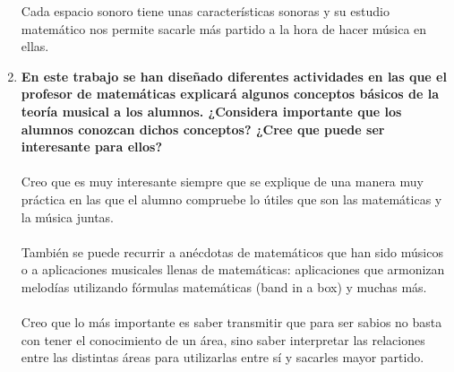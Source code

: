 \documentclass[a4paper, openright, 11pt, titlepage]{report}
\theoremstyle{definition}\newtheorem{defin}[propo]{Definition}
\theoremstyle{definition}\newtheorem{obser}[propo]{Remark}
\theoremstyle{definition}\newtheorem{ejem}[propo]{Ejemplo}
\theoremstyle{definition}\newtheorem{algoritmo}[propo]{Algoritmo}
\begin{document}
\begin{enumerate}
    Cada espacio sonoro tiene unas características sonoras y su estudio matemático nos permite sacarle más partido a la hora de hacer música en ellas.
    \item \textbf{En este trabajo se han diseñado diferentes actividades en las que el profesor de matemáticas explicará algunos conceptos básicos de la teoría musical a los alumnos. ¿Considera importante que los alumnos conozcan dichos conceptos? ¿Cree que puede ser interesante para ellos?}\\\\
    Creo que es muy  interesante siempre que se explique de una manera muy práctica en las que el alumno compruebe lo útiles que son las matemáticas y la música juntas.\\\\
    También se puede recurrir a anécdotas de matemáticos que han sido músicos o a aplicaciones musicales llenas de matemáticas: aplicaciones que armonizan melodías utilizando fórmulas matemáticas (band in a box) y muchas más.\\\\
    Creo que lo más importante es saber transmitir que para ser sabios no basta con tener el conocimiento de un área, sino saber interpretar las relaciones entre las distintas áreas para utilizarlas entre sí y sacarles mayor partido.
\end{enumerate}
\end{document}
